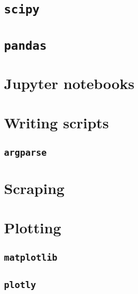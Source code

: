 \documentclass[
]{book}
\begin{document}
\hypertarget{p-scipy}{%
\section{\texorpdfstring{\texttt{scipy}}{scipy}}\label{p-scipy}}

\hypertarget{p-pandas}{%
\section{\texorpdfstring{\texttt{pandas}}{pandas}}\label{p-pandas}}

\hypertarget{p-jupyter-notebooks}{%
\section{Jupyter notebooks}\label{p-jupyter-notebooks}}

\hypertarget{p-writing-scripts}{%
\section{Writing scripts}\label{p-writing-scripts}}

\hypertarget{p-argparse}{%
\subsection{\texorpdfstring{\texttt{argparse}}{argparse}}\label{p-argparse}}

\hypertarget{p-scraping}{%
\section{Scraping}\label{p-scraping}}

\hypertarget{p-plotting}{%
\section{Plotting}\label{p-plotting}}

\hypertarget{p-matplotlib}{%
\subsection{\texorpdfstring{\texttt{matplotlib}}{matplotlib}}\label{p-matplotlib}}

\hypertarget{p-plotly}{%
\subsection{\texorpdfstring{\texttt{plotly}}{plotly}}\label{p-plotly}}
\end{document}
